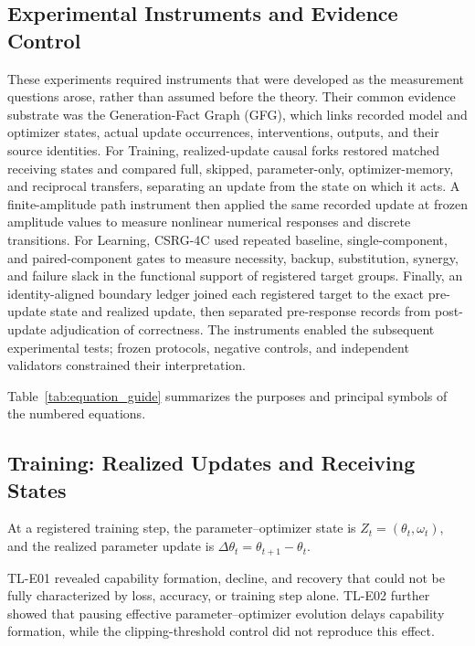 \documentclass[12pt,letterpaper]{article}
\begin{document}
\subsection{Experimental Instruments and Evidence Control}
These experiments required instruments that were developed as the measurement questions arose, rather than assumed before the theory. Their common evidence substrate was the Generation-Fact Graph (GFG), which links recorded model and optimizer states, actual update occurrences, interventions, outputs, and their source identities. For Training, realized-update causal forks restored matched receiving states and compared full, skipped, parameter-only, optimizer-memory, and reciprocal transfers, separating an update from the state on which it acts. A finite-amplitude path instrument then applied the same recorded update at frozen amplitude values to measure nonlinear numerical responses and discrete transitions. For Learning, CSRG-4C used repeated baseline, single-component, and paired-component gates to measure necessity, backup, substitution, synergy, and failure slack in the functional support of registered target groups. Finally, an identity-aligned boundary ledger joined each registered target to the exact pre-update state and realized update, then separated pre-response records from post-update adjudication of correctness. The instruments enabled the subsequent experimental tests; frozen protocols, negative controls, and independent validators constrained their interpretation.


Table~\ref{tab:equation_guide} summarizes the purposes and principal symbols of the numbered equations.

\subsection{Training: Realized Updates and Receiving States}
At a registered training step, the parameter--optimizer state is $Z_t=(\theta_t,\omega_t)$, and the realized parameter update is $\Delta\theta_t=\theta_{t+1}-\theta_t$.

TL-E01 revealed capability formation, decline, and recovery that could not be fully characterized by loss, accuracy, or training step alone. TL-E02 further showed that pausing effective parameter--optimizer evolution delays capability formation, while the clipping-threshold control did not reproduce this effect.
\end{document}
